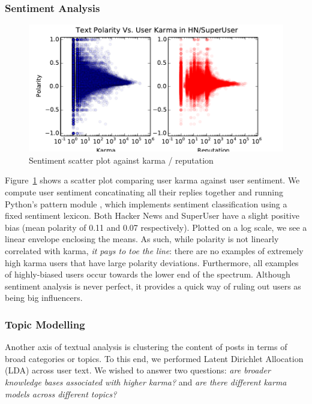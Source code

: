 \documentclass[11pt]{article}
\begin{document}
\subsubsection{Sentiment Analysis}
\label{sec:sentiment}
\begin{figure}[h]
\centering
\includegraphics[width=\linewidth]{text_polarity}
\caption{Sentiment scatter plot against karma / reputation}
\label{fig:sentiment}
\end{figure}

Figure~\ref{fig:sentiment} shows a scatter plot comparing user karma
against user sentiment. We compute user sentiment concatinating all
their replies together and running Python's pattern module \citet{de2012pattern}, 
which implements sentiment classification using a fixed sentiment lexicon.  Both
Hacker News and SuperUser have a slight positive bias (mean polarity of 0.11 and
0.07 respectively). Plotted on a log scale, we see a linear envelope enclosing
the means. As such, while polarity is not linearly correlated with karma,
\textit{it pays to toe the line}: there are no examples of extremely high karma
users that have large polarity deviations. Furthermore, all examples of
highly-biased users occur towards the lower end of the spectrum. Although
sentiment analysis is never perfect, it provides a quick way of ruling out users
as being big influencers.

\subsubsection{Topic Modelling}
Another axis of textual analysis is clustering the content of posts in terms of
broad categories or topics. To this end, we performed Latent Dirichlet
Allocation (LDA) \cite{blei2003latent} across user text. We wished to answer two
questions: \textit{are broader knowledge bases associated with higher karma?} and
\textit{are there different karma models across different topics?}
\end{document}
